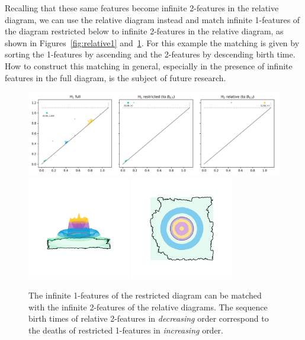 Recalling that these same features become infinite 2-features in the relative diagram, we can use the relative diagram instead and match infinite 1-features of the diagram restricted below to infinite 2-features in the relative diagram, as shown in Figures~\ref{fig:relative1} and~\ref{fig:relative2}.
For this example the matching is given by sorting the 1-features by ascending and the 2-features by descending birth time.
How to construct this matching in general, especially in the presence of infinite features in the full diagram, is the subject of future research.

\begin{figure}[htbp]\label{fig:relative2}
  \centering
  \includegraphics[width=\textwidth]{scripts/figures/relative/dgm-0_1.png}
  \includegraphics[trim=500 800 500 800, clip, width=0.4\textwidth]{scripts/figures/relative/surf_side-0_1.png}
  \includegraphics[trim=500 500 500 500, clip, width=0.4\textwidth]{scripts/figures/relative/surf_top-0_1.png}
  \caption{The infinite 1-features of the restricted diagram can be matched with the infinite 2-features of the relative diagrams.
  The sequence birth times of relative 2-features in \emph{decreasing} order correspond to the deaths of restricted 1-features in \emph{increasing} order.}
\end{figure}
